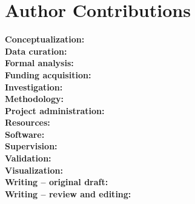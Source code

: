 \section{Author Contributions}
\label{sec:author_contributions}


\noindent
\textbf{Conceptualization:} \\
\textbf{Data curation:} \\
\textbf{Formal analysis:} \\
\textbf{Funding acquisition:} \\
\textbf{Investigation:} \\
\textbf{Methodology:} \\
\textbf{Project administration:} \\
\textbf{Resources:} \\
\textbf{Software:} \\
\textbf{Supervision:} \\
\textbf{Validation:} \\
\textbf{Visualization:} \\
\textbf{Writing -- original draft:} \\
\textbf{Writing -- review and editing:}

